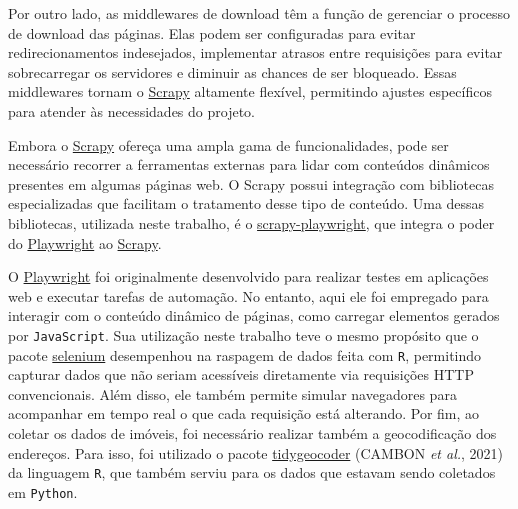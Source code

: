 \documentclass[
  12pt,
  a4paper,
]{scrreprt}
\begin{document}
\vspace{12pt}

Por outro lado, as middlewares de download têm a função de gerenciar o
processo de download das páginas. Elas podem ser configuradas para
evitar redirecionamentos indesejados, implementar atrasos entre
requisições para evitar sobrecarregar os servidores e diminuir as
chances de ser bloqueado. Essas middlewares tornam o
\href{https://docs.scrapy.org/en/latest}{Scrapy} altamente flexível,
permitindo ajustes específicos para atender às necessidades do projeto.

\vspace{12pt}

Embora o \href{https://docs.scrapy.org/en/latest}{Scrapy} ofereça uma
ampla gama de funcionalidades, pode ser necessário recorrer a
ferramentas externas para lidar com conteúdos dinâmicos presentes em
algumas páginas web. O Scrapy possui integração com bibliotecas
especializadas que facilitam o tratamento desse tipo de conteúdo. Uma
dessas bibliotecas, utilizada neste trabalho, é o
\href{https://github.com/scrapy-plugins/scrapy-playwright}{scrapy-playwright},
que integra o poder do \href{https://playwright.dev/python/}{Playwright}
ao \href{https://docs.scrapy.org/en/latest}{Scrapy}.

\vspace{12pt}

O \href{https://playwright.dev/python/}{Playwright} foi originalmente
desenvolvido para realizar testes em aplicações web e executar tarefas
de automação. No entanto, aqui ele foi empregado para interagir com o
conteúdo dinâmico de páginas, como carregar elementos gerados por
\texttt{JavaScript}. Sua utilização neste trabalho teve o mesmo
propósito que o pacote
\href{https://cran.r-project.org/web/packages/selenium/index.html}{selenium}
desempenhou na raspagem de dados feita com \texttt{R}, permitindo
capturar dados que não seriam acessíveis diretamente via requisições
HTTP convencionais. Além disso, ele também permite simular navegadores
para acompanhar em tempo real o que cada requisição está alterando. Por
fim, ao coletar os dados de imóveis, foi necessário realizar também a
geocodificação dos endereços. Para isso, foi utilizado o pacote
\href{https://jessecambon.github.io/tidygeocoder/}{tidygeocoder} (CAMBON
\emph{et al.}, 2021) da linguagem \texttt{R}, que também serviu para os
dados que estavam sendo coletados em \texttt{Python}.

\vspace{12pt}
\end{document}
